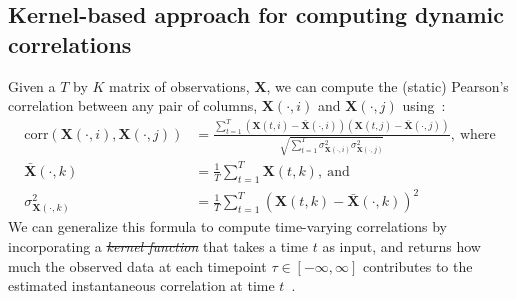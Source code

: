 \documentclass[english]{article}
\providecommand{\DIFaddtex}[1]{{\protect\color{blue}\uwave{#1}}} %
\providecommand{\DIFdeltex}[1]{{\protect\color{red}\sout{#1}}}                      %
\providecommand{\DIFaddbegin}{} %
\providecommand{\DIFaddend}{} %
\providecommand{\DIFdelbegin}{} %
\providecommand{\DIFdelend}{} %
\providecommand{\DIFadd}[1]{\texorpdfstring{\DIFaddtex{#1}}{#1}} %
\providecommand{\DIFdel}[1]{\texorpdfstring{\DIFdeltex{#1}}{}} %
\newcommand{\DIFscaledelfig}{0.5}
\newlength{\DIFdelgraphicswidth} %
\newlength{\DIFdelgraphicsheight} %
\newcommand{\DIFaddincludegraphics}[2][]{{\color{blue}\fbox{\DIFOincludegraphics[#1]{#2}}}} %
\newcommand{\DIFdelincludegraphics}[2][]{%
\sbox{\DIFdelgraphicsbox}{\DIFOincludegraphics[#1]{#2}}%
\settoboxwidth{\DIFdelgraphicswidth}{\DIFdelgraphicsbox} %
\settoboxtotalheight{\DIFdelgraphicsheight}{\DIFdelgraphicsbox} %
\scalebox{\DIFscaledelfig}{%
\parbox[b]{\DIFdelgraphicswidth}{\usebox{\DIFdelgraphicsbox}\\[-\baselineskip] \rule{\DIFdelgraphicswidth}{0em}}\llap{\resizebox{\DIFdelgraphicswidth}{\DIFdelgraphicsheight}{%
\setlength{\unitlength}{\DIFdelgraphicswidth}%
\begin{picture}(1,1)%
\thicklines\linethickness{2pt} %
{\color[rgb]{1,0,0}\put(0,0){\framebox(1,1){}}}%
{\color[rgb]{1,0,0}\put(0,0){\line( 1,1){1}}}%
{\color[rgb]{1,0,0}\put(0,1){\line(1,-1){1}}}%
\end{picture}%
}\hspace*{3pt}}} %
} %
\DeclareRobustCommand{\DIFaddbegin}{\DIFOaddbegin \let\includegraphics\DIFaddincludegraphics} %
\DeclareRobustCommand{\DIFaddend}{\DIFOaddend \let\includegraphics\DIFOincludegraphics} %
\DeclareRobustCommand{\DIFdelbegin}{\DIFOdelbegin \let\includegraphics\DIFdelincludegraphics} %
\DeclareRobustCommand{\DIFdelend}{\DIFOaddend \let\includegraphics\DIFOincludegraphics} %
\begin{document}
\subsection*{Kernel-based approach for computing dynamic correlations}
Given a $T$ by $K$ matrix of observations, $\mathbf{X}$, we can compute the (static)
Pearson's correlation between any pair of columns, $\mathbf{X}(\cdot, i)$ and
$\mathbf{X}(\cdot, j)$ using~\citep{Pear01}:
\begin{align}
  \mathrm{corr}(\mathbf{X}(\cdot, i), \mathbf{X}(\cdot, j)) &=
                                                              \frac{\sum_{t=1}^T
                                                              \left(\mathbf{X}(t,
                                                              i)
                                                              -
                                                              \bar{\mathbf{X}}(\cdot,
                                                              i)\right)
                                                              \left(\mathbf{X}(t,
                                                              j)
                                                              -
                                                              \bar{\mathbf{X}}(\cdot, j)\right)}{\sqrt{\sum_{t=1}^T
                                                              \sigma^2_{\mathbf{X}(\cdot, i)} 
                                                              \sigma^2_{\mathbf{X}(\cdot, j)}}},~\mathrm{where}\label{eqn:corr}\\
  \bar{\mathbf{X}}(\cdot, k) &= \frac{1}{T}\sum_{t=1}^T
                               \mathbf{X}(t, k),~\mathrm{and}\\
  \sigma^2_{\mathbf{X}(\cdot, k)} &= \frac{1}{T}\sum_{t=1}^T \left( \mathbf{X}(t, k) -
                                    \bar{\mathbf{X}}(\cdot, k) \right)^2 
\end{align}
We can generalize this formula to compute time-varying correlations by
incorporating a \DIFdelbegin \textit{\DIFdel{kernel function}} %
\DIFdelend \DIFaddbegin \DIFadd{kernel function }\DIFaddend that takes a time $t$ as
input, and returns how much the observed data at each timepoint
$\tau \in \left[ -\infty, \infty \right]$ contributes to the estimated instantaneous
correlation at time $t$~\citep[Fig.~\ref{fig:kernels}; also see][for a
similar approach]{AlleEtal12b}.
\end{document}
